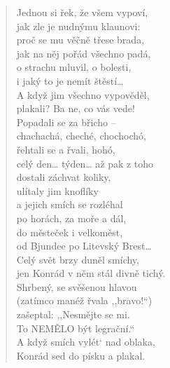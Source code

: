 \begin{verse}
Jednou si řek, že všem vypoví,\\
jak zle je nudnýmu klaunovi:\\
proč se mu věčně třese brada,  \\
jak na něj pořád všechno padá,\\
o strachu mluvil, o bolesti,  \\
i jaký to je nemít štěstí…\\
A když jim všechno vypověděl,\\
plakali? Ba ne, co vás vede!\\
Popadali se za břicho –\\
chachachá, cheché, chochochó,\\
řehtali se a řvali, hohó,  \\
celý den… týden… až pak z toho\\
dostali záchvat koliky,\\
ulítaly jim knoflíky\\
a jejich smích se rozléhal\\
po horách, za moře a dál,  \\
do městeček i velkoměst,\\  
od Bjundee po Litevský Brest…\\
Celý svět brzy duněl smíchy,\\
jen Konrád v něm stál divně tichý.\\
Shrbený, se svěšenou hlavou\\
(zatímco manéž řvala ,,bravo!``)\\
zašeptal: ,,Nesmějte se mi.\\
To NEMĚLO být legrační.``\\
A když smích vylét` nad oblaka,\\
Konrád sed do písku a plakal.
\end{verse}


\bigskip

